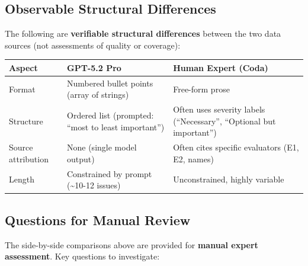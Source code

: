 \documentclass[
  11pt,
  letterpaper,
  DIV=11,
  numbers=noendperiod]{scrreprt}
\begin{document}
\subsection{Observable Structural
Differences}\label{observable-structural-differences}

The following are \textbf{verifiable structural differences} between the
two data sources (not assessments of quality or coverage):

\begin{longtable}[]{@{}
  >{\raggedright\arraybackslash}p{}
  >{\raggedright\arraybackslash}p{}
  >{\raggedright\arraybackslash}p{}@{}}
\toprule\noalign{}
\begin{minipage}[b]{\linewidth}\raggedright
Aspect
\end{minipage} & \begin{minipage}[b]{\linewidth}\raggedright
GPT-5.2 Pro
\end{minipage} & \begin{minipage}[b]{\linewidth}\raggedright
Human Expert (Coda)
\end{minipage} \\
\midrule\noalign{}
\endhead
\bottomrule\noalign{}
\endlastfoot
Format & Numbered bullet points (array of strings) & Free-form prose \\
Structure & Ordered list (prompted: ``most to least important'') & Often
uses severity labels (``Necessary'', ``Optional but important'') \\
Source attribution & None (single model output) & Often cites specific
evaluators (E1, E2, names) \\
Length & Constrained by prompt (\textasciitilde10-12 issues) &
Unconstrained, highly variable \\
\end{longtable}

\subsection{Questions for Manual
Review}\label{questions-for-manual-review}

The side-by-side comparisons above are provided for \textbf{manual
expert assessment}. Key questions to investigate:
\end{document}
